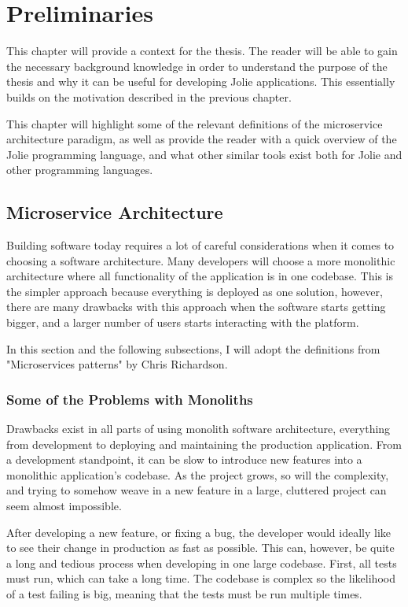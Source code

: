 \chapter{Preliminaries}
This chapter will provide a context for the thesis.
The reader will be able to gain the necessary background knowledge in order
to understand the purpose of the thesis and why it can be useful for developing Jolie applications. This 
essentially builds on the motivation
described in the previous chapter.

This chapter will highlight some of the relevant definitions of the microservice architecture paradigm, as
 well as provide
the reader with a quick overview of the Jolie programming language, and what other similar tools exist 
both for Jolie and other programming languages.

\section{Microservice Architecture}
Building software today requires a lot of careful considerations when it comes
to choosing a software architecture. Many developers will choose a more monolithic architecture where all
 functionality of the application
is in one codebase. This is the simpler approach because everything is deployed as one solution, however,
 there are many drawbacks
with this approach when the software starts getting bigger, and a larger number of users starts 
interacting with the platform.

In this section and the following subsections, I will adopt the definitions from "Microservices patterns"
 by Chris Richardson. \cite{microservicepatterns}

\subsection{Some of the Problems with Monoliths}
Drawbacks exist in all parts of using monolith software architecture, everything from development to 
deploying and maintaining the production application.
From a development standpoint, it can be slow to introduce new features into a monolithic application's
 codebase. As the project grows, so will the complexity, and trying to somehow weave in a new feature in a large, cluttered project can seem almost impossible.

After developing a new feature, or fixing a bug, the developer would ideally like to see their change 
in production as fast as possible. This can, however, be quite a long and tedious process when developing in one large codebase.
First, all tests must run, which can take a long time. The codebase is complex so the likelihood of a 
test failing is big, meaning that the tests must be run multiple times.

